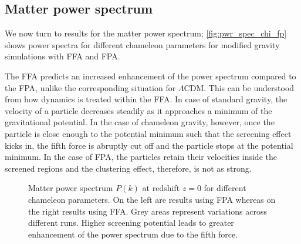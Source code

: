 \subsection{Matter power spectrum}
We now turn to results for the matter power spectrum; \autoref{fig:pwr_spec_chi_fp} shows power spectra for different chameleon parameters for modified gravity simulations with FFA and FPA.

The FFA predicts an increased enhancement of the power spectrum compared to the FPA, unlike the corresponding situation for $\Lambda$CDM. This can be understood from how dynamics is treated within the FFA. In case of standard gravity, the velocity of a particle decreases steadily as it approaches a minimum of the gravitational potential. In the case of chameleon gravity, however, once the particle is close enough to the potential minimum such that the screening effect kicks in, the fifth force is abruptly cut off and the particle stops at the potential minimum. In the case of FPA, the particles retain their velocities inside the screened regions and the clustering effect, therefore, is not as strong.

\begin{figure*}
\centering
	\chileft
	\begin{subfigure}{1.2\textwidth}
	\end{subfigure}
	\begin{subfigure}{0.5\textwidth}
	\end{subfigure}%
	\begin{subfigure}{0.5\textwidth}
	\end{subfigure}
	\begin{subfigure}{0.5\textwidth}
	\end{subfigure}%
	\begin{subfigure}{0.5\textwidth}
	\end{subfigure}
    \caption{Matter power spectrum $P(k)$ at redshift $z=0$ for different chameleon parameters. On the left are results using FPA whereas on the right results using FFA. Grey areas represent variations across different runs. Higher screening potential leads to greater enhancement of the power spectrum due to the fifth force.}
    \label{fig:pwr_spec_chi_fp}
\end{figure*}

